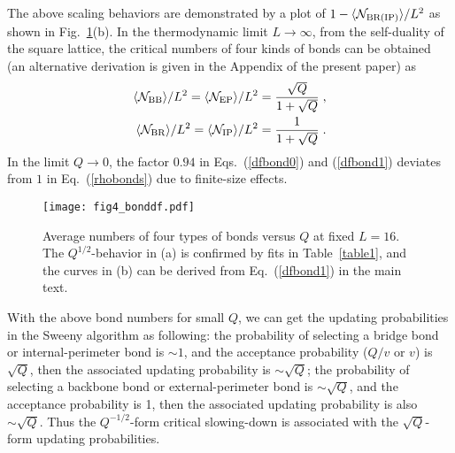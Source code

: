 \documentclass[aps,pre,twocolumn,superscriptaddress,longbibliography,floatfix]{revtex4-2}
\begin{document}
The above scaling behaviors are demonstrated by a plot of $1-\langle \mathcal{N}_{\rm BR(IP)}\rangle /L^2$ as shown in Fig.~\ref{bonddf}(b).
In the thermodynamic limit $L \rightarrow \infty$, from the self-duality of the square lattice, the critical numbers of
four kinds of bonds can be obtained~\cite{Eren2016} (an alternative derivation is given in the Appendix of the present paper) as
\begin{align}
    \langle\mathcal{N}_{\rm BB}\rangle/L^2 = \langle\mathcal{N}_{\rm EP}\rangle/L^2 = \frac{\sqrt{Q}}{1+\sqrt{Q}} \;, \nonumber \\
    \langle\mathcal{N}_{\rm BR}\rangle/L^2 = \langle\mathcal{N}_{\rm IP}\rangle/L^2 = \frac{1}{1+\sqrt{Q}} \;.
\label{rhobonds}
\end{align}
In the limit $Q \rightarrow 0$, the factor $0.94$ in Eqs.~(\ref{dfbond0}) and (\ref{dfbond1}) deviates from $1$ in Eq.~(\ref{rhobonds}) due to finite-size effects.

\begin{figure}[t] 
\centering
\texttt{[image: fig4\_bonddf.pdf]}
\caption{Average numbers of four types of bonds versus $Q$ at fixed $L=16$. 
The $Q^{1/2}$-behavior in (a) is confirmed by fits in Table~\ref{table1}, and the curves in (b) can be derived from Eq.~(\ref{dfbond1}) in the main text.}
\label{bonddf}
\end{figure}

With the above bond numbers for small $Q$, we can get the updating probabilities in the Sweeny algorithm as following:
the probability of selecting a bridge bond or internal-perimeter bond is $\sim 1$, and the acceptance probability ($Q/v$ or $v$) is $\sqrt{Q}$, then the associated updating probability is $\sim \sqrt{Q}$; 
the probability of selecting a backbone bond or external-perimeter bond is $\sim \sqrt{Q}$, and the acceptance probability is 1, then the associated updating probability is also $\sim \sqrt{Q}$. 
Thus the $Q^{-1/2}$-form critical slowing-down is associated with the $\sqrt{Q}$-form updating probabilities.
\end{document}
